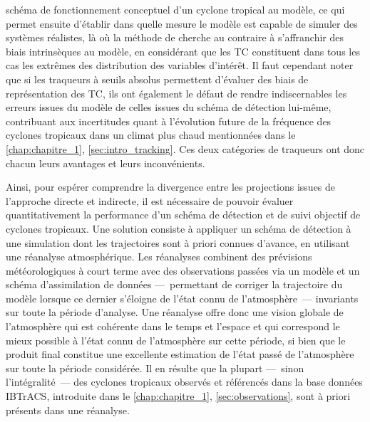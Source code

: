 \documentclass[../main.tex]{subfiles}
\begin{document}
schéma de fonctionnement conceptuel d'un cyclone tropical au modèle, ce qui permet ensuite d'établir dans quelle mesure le modèle est capable de simuler des
systèmes réalistes, là où la méthode de \textcite{camargo_improving_2002} cherche au contraire à s'affranchir des biais intrinsèques au modèle, en considérant
que les TC constituent dans tous les cas les extrêmes des distribution des variables d'intérêt. Il faut cependant noter que si les traqueurs à seuils absolus
permettent d'évaluer des biais de représentation des TC, ils ont également le défaut de rendre indiscernables les erreurs issues du modèle de celles issues du
schéma de détection lui-même, contribuant aux incertitudes quant à l'évolution future de la fréquence des cyclones tropicaux dans un climat plus chaud
mentionnées dans le \cref{chap:chapitre_1}, \cref{sec:intro_tracking}. Ces deux catégories de traqueurs ont donc chacun leurs avantages et leurs inconvénients.

Ainsi, pour espérer comprendre la divergence entre les projections issues de l'approche directe et indirecte, il est nécessaire de pouvoir évaluer
quantitativement la performance d'un schéma de détection et de suivi objectif de cyclones tropicaux. Une solution consiste à appliquer un schéma de détection à
une simulation dont les trajectoires sont à priori connues d'avance, en utilisant une réanalyse atmosphérique. Les réanalyses combinent des prévisions
météorologiques à court terme avec des observations passées via un modèle et un schéma d'assimilation de données ---~permettant de corriger la trajectoire du
modèle lorsque ce dernier s'éloigne de l'état connu de l'atmosphère~--- invariants sur toute la période d'analyse. Une réanalyse offre donc une vision globale
de l'atmosphère qui est cohérente dans le temps et l'espace et qui correspond le mieux possible à l'état connu de l'atmosphère sur cette période, si bien que le
produit final constitue une excellente estimation de l'état passé de l'atmosphère sur toute la période considérée. Il en résulte que la plupart ---~sinon
l'intégralité~--- des cyclones tropicaux observés et référencés dans la base données IBTrACS, introduite dans le \cref{chap:chapitre_1},
\cref{sec:observations}, sont à priori présents dans une réanalyse.
\end{document}
